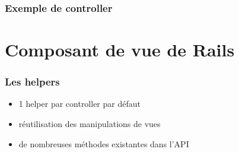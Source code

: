 \documentclass{beamer}
\begin{document}
\begin{frame}
    \frametitle{Exemple de controller}
    
\end{frame}

\section{Composant de vue de Rails}

\begin{frame}
    \frametitle{Les helpers}

    \begin{itemize}
        \item 1 helper par controller par défaut
        \item réutilisation des manipulations de vues
        \item de nombreuses méthodes existantes dans l'API
    \end{itemize}
\end{frame}
\end{document}
